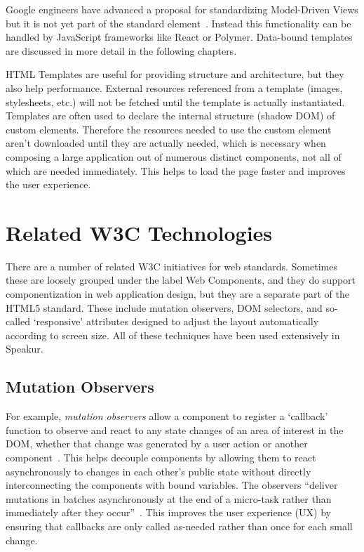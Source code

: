 Google engineers have advanced a proposal for standardizing 
Model-Driven Views
but it is not yet part of the standard  element~\cite{googledevelopers2014}.
Instead this functionality can be handled by JavaScript frameworks like React or Polymer.
Data-bound templates are discussed in more detail in the following chapters.

HTML Templates are useful for providing structure and architecture, but they also help performance. 
External resources referenced from a template (images, stylesheets, etc.) will not be fetched until the template is actually instantiated.
Templates are often used to declare the internal structure (shadow DOM) of custom elements. 
Therefore the resources needed to use the custom element aren't downloaded until they are actually needed, which is necessary when composing a large application out of numerous distinct components, 
not all of which are needed immediately.
This helps to load the page faster and improves the user experience.

\section{Related W3C Technologies}
There are a number of related W3C initiatives for web standards. 
Sometimes these are loosely grouped under the label Web Components,
and they do support componentization in web application design, 
but they are a separate part of the HTML5 standard.
These include mutation observers, 
DOM selectors, 
and so-called `responsive' attributes designed to adjust the layout automatically according to screen size.
All of these techniques have been used extensively in Speakur.

\subsection{Mutation Observers}
\label{sec:bgmutation}
For example, \textit{mutation observers}
allow a component to register a `callback' function to observe and react to any state changes of an area of interest in the DOM, 
whether that change was generated by a user action or another 
component~\cite{w3ccontributors2014}.
This helps decouple components by allowing them to react asynchronously to changes in each other's public state without directly interconnecting the components with bound variables.
The observers ``deliver mutations in batches asynchronously at the end of a micro-task rather than immediately after they occur''~\cite{addyosmani2014}.
This improves the user experience (UX) by ensuring that callbacks are only called as-needed rather than once for each small change.


